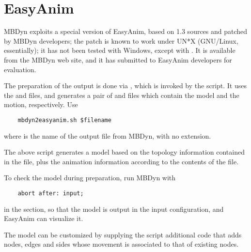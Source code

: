 \section{EasyAnim}
MBDyn exploits a special version of EasyAnim, based on 1.3 sources
and patched by MBDyn developers; the patch is known to work under UN*X
(GNU/Linux, essentially); it has not been tested with Windows, except with
.
It is available from the MBDyn web site, and it has submitted to EasyAnim
developers for evaluation.

The preparation of the output is done via , which is invoked
by the  script.
It uses the  and  files, and generates a pair of
 and  files which contain the model and the motion,
respectively.
Use
\begin{verbatim}
    mbdyn2easyanim.sh $filename
\end{verbatim}
where  is the name of the output file from MBDyn,
with no extension.

The above script generates a model based on the topology information
contained in the  file, plus the animation information
according to the contents of the  file.

To check the model during preparation, run MBDyn with
\begin{verbatim}
    abort after: input;
\end{verbatim}
in the  section, so that the model is output 
in the input configuration, and EasyAnim can visualize it.

The model can be customized by supplying the 
script additional  code that adds nodes, edges and sides 
whose movement is associated to that of existing nodes.


